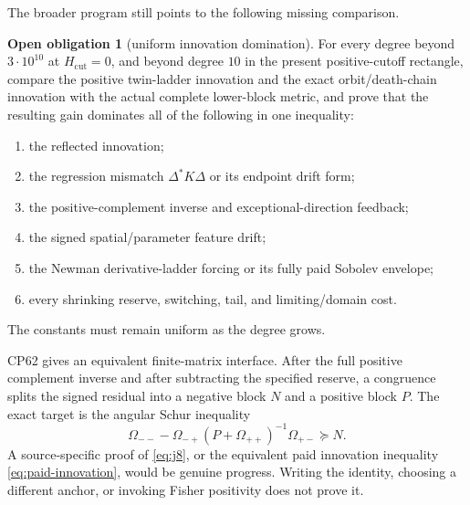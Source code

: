 \documentclass[11pt]{article}
\theoremstyle{definition}
\newtheorem{obligation}[theorem]{Open obligation}
\theoremstyle{remark}
\begin{document}
The broader program still points to the following missing comparison.

\begin{obligation}[uniform innovation domination]
For every degree beyond $3\cdot10^{10}$ at $H_{\mathrm{cut}}=0$, and beyond
degree $10$ in the present positive-cutoff rectangle, compare the positive
twin-ladder innovation and the exact orbit/death-chain innovation with the
actual complete lower-block metric, and prove that the resulting gain dominates
all of the following in one inequality:
\begin{enumerate}[label=(\roman*)]
\item the reflected innovation;
\item the regression mismatch $\Delta^*K\Delta$ or its endpoint drift form;
\item the positive-complement inverse and exceptional-direction feedback;
\item the signed spatial/parameter feature drift;
\item the Newman derivative-ladder forcing or its fully paid Sobolev envelope;
\item every shrinking reserve, switching, tail, and limiting/domain cost.
\end{enumerate}
The constants must remain uniform as the degree grows.
\end{obligation}

CP62 gives an equivalent finite-matrix interface. After the full positive
complement inverse and after subtracting the specified reserve, a congruence
splits the signed residual into a negative block $N$ and a positive block $P$.
The exact target is the angular Schur inequality
\begin{equation}
 \Omega_{--}-\Omega_{-+}(P+\Omega_{++})^{-1}\Omega_{+-}\succeq N.
 \label{eq:j8}
\end{equation}
A source-specific proof of \eqref{eq:j8}, or the equivalent paid innovation
inequality \eqref{eq:paid-innovation}, would be genuine progress. Writing the
identity, choosing a different anchor, or invoking Fisher positivity does not
prove it.
\end{document}
